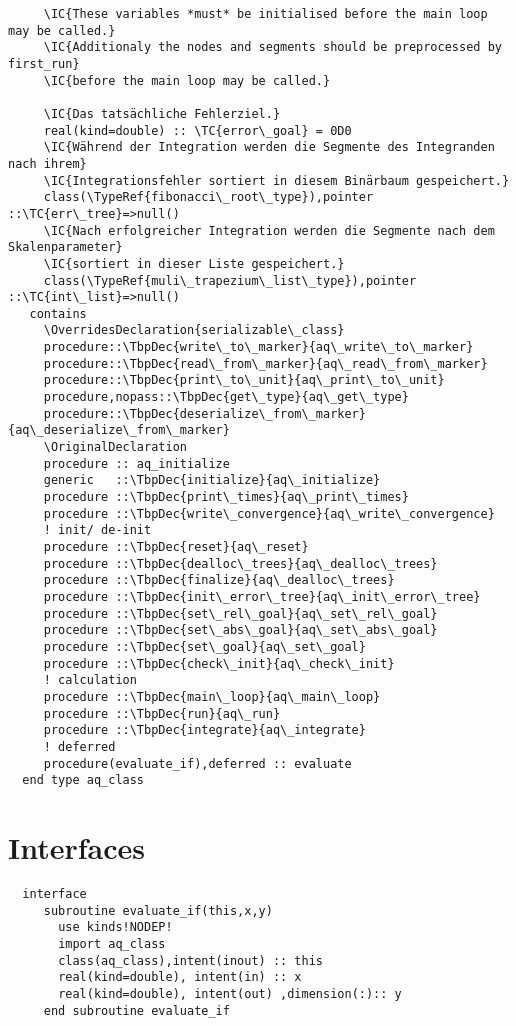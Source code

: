 \begin{Verbatim}
     \IC{These variables *must* be initialised before the main loop may be called.}
     \IC{Additionaly the nodes and segments should be preprocessed by first_run}
     \IC{before the main loop may be called.}
     
     \IC{Das tatsächliche Fehlerziel.}
     real(kind=double) :: \TC{error\_goal} = 0D0
     \IC{Während der Integration werden die Segmente des Integranden nach ihrem}
     \IC{Integrationsfehler sortiert in diesem Binärbaum gespeichert.}
     class(\TypeRef{fibonacci\_root\_type}),pointer ::\TC{err\_tree}=>null()
     \IC{Nach erfolgreicher Integration werden die Segmente nach dem Skalenparameter}
     \IC{sortiert in dieser Liste gespeichert.}
     class(\TypeRef{muli\_trapezium\_list\_type}),pointer ::\TC{int\_list}=>null()
   contains
     \OverridesDeclaration{serializable\_class}
     procedure::\TbpDec{write\_to\_marker}{aq\_write\_to\_marker}
     procedure::\TbpDec{read\_from\_marker}{aq\_read\_from\_marker}
     procedure::\TbpDec{print\_to\_unit}{aq\_print\_to\_unit}
     procedure,nopass::\TbpDec{get\_type}{aq\_get\_type}
     procedure::\TbpDec{deserialize\_from\_marker}{aq\_deserialize\_from\_marker}
     \OriginalDeclaration
     procedure :: aq_initialize
     generic   ::\TbpDec{initialize}{aq\_initialize}
     procedure ::\TbpDec{print\_times}{aq\_print\_times}
     procedure ::\TbpDec{write\_convergence}{aq\_write\_convergence}
     ! init/ de-init
     procedure ::\TbpDec{reset}{aq\_reset}
     procedure ::\TbpDec{dealloc\_trees}{aq\_dealloc\_trees}
     procedure ::\TbpDec{finalize}{aq\_dealloc\_trees}
     procedure ::\TbpDec{init\_error\_tree}{aq\_init\_error\_tree}
     procedure ::\TbpDec{set\_rel\_goal}{aq\_set\_rel\_goal}
     procedure ::\TbpDec{set\_abs\_goal}{aq\_set\_abs\_goal}
     procedure ::\TbpDec{set\_goal}{aq\_set\_goal}
     procedure ::\TbpDec{check\_init}{aq\_check\_init}
     ! calculation
     procedure ::\TbpDec{main\_loop}{aq\_main\_loop}
     procedure ::\TbpDec{run}{aq\_run}
     procedure ::\TbpDec{integrate}{aq\_integrate}
     ! deferred
     procedure(evaluate_if),deferred :: evaluate
  end type aq_class
\end{Verbatim}
\section{Interfaces}
\begin{Verbatim}
  interface
     subroutine evaluate_if(this,x,y)
       use kinds!NODEP!
       import aq_class
       class(aq_class),intent(inout) :: this
       real(kind=double), intent(in) :: x
       real(kind=double), intent(out) ,dimension(:):: y
     end subroutine evaluate_if
   \end{Verbatim}
\Methods
{}

